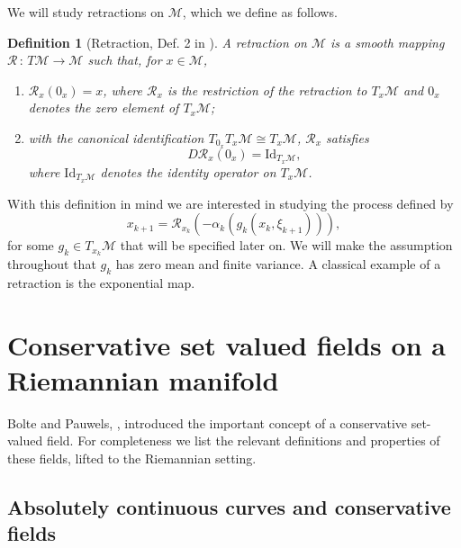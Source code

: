 \documentclass{article}
\newtheorem{definition}{Definition}
\newcommand{\CM}{\mathcal{M}}
\begin{document}
We will study retractions on $\CM$, which we define as follows.
\begin{definition}[Retraction, Def. 2 in \cite{shah2021stochastic}]
    A retraction on $\CM$ is a smooth mapping $\mathcal{R}\,:\,T\CM\to\CM$ such that, for $x\in\CM$,
    \begin{enumerate}
        \item $\mathcal{R}_x(0_x)=x$, where $\mathcal{R}_x$ is the restriction of the retraction to $T_x\CM$ and $0_x$ denotes the zero element of $T_x\CM$;
        \item with the canonical identification $T_{0_x}T_x\CM\cong T_x\CM$, $\mathcal{R}_x$ satisfies
        \begin{equation}
            D\mathcal{R}_x(0_x)=\text{Id}_{T_x\CM},
        \end{equation}
        where $\text{Id}_{T_x\CM}$ denotes the identity operator on $T_x\CM$. 
    \end{enumerate}
\end{definition}
With this definition in mind we are interested in studying the process defined by
\begin{equation}\label{eq:retraction_process}
    x_{k+1}=\mathcal{R}_{x_k}(-\alpha_k(g_k(x_k,\xi_{k+1}))),
\end{equation}
for some $g_k\in T_{x_k}\CM$ that will be specified later on. We will make the assumption throughout that $g_k$ has zero mean and finite variance. A classical example of a retraction is the exponential map.




\section{Conservative set valued fields on a Riemannian manifold}\label{s:consriem}
Bolte and Pauwels, \cite{bolte2021conservative}, introduced the important concept of a conservative set-valued field. For completeness we list the relevant definitions and properties of these fields, lifted to the Riemannian setting.



\subsection{Absolutely continuous curves and conservative fields}

\end{document}
